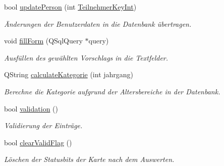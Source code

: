 \begin{CompactItemize}
bool \hyperlink{class_r_f_i_d_input_dialog_cfbdcec5da0cd09b10edbb23bfd9a185}{updatePerson} (int \hyperlink{class_r_f_i_d_input_dialog_557be7292bf8509e793dc17e79d18e75}{TeilnehmerKeyInt})
\begin{CompactList}\small\item\em Änderungen der Benutzerdaten in die Datenbank übertragen. \item\end{CompactList}\item 
void \hyperlink{class_r_f_i_d_input_dialog_7ed5355f398c29b79d81c4a4cd7b7c11}{fillForm} (QSqlQuery $\ast$query)
\begin{CompactList}\small\item\em Ausfüllen des gewählten Vorschlags in die Textfelder. \item\end{CompactList}\item 
QString \hyperlink{class_r_f_i_d_input_dialog_d034adfda34da3b178582a7aa17ae059}{calculateKategorie} (int jahrgang)
\begin{CompactList}\small\item\em Berechne die Kategorie aufgrund der Altersbereiche in der Datenbank. \item\end{CompactList}\item 
bool \hyperlink{class_r_f_i_d_input_dialog_ebed3331b476fb984343d6b3cef19a5a}{validation} ()
\begin{CompactList}\small\item\em Validierung der Einträge. \item\end{CompactList}\item 
bool \hyperlink{class_r_f_i_d_input_dialog_a466a7c7bb57d2c3163ce2d400b9f6af}{clearValidFlag} ()
\begin{CompactList}\small\item\em Löschen der Statusbits der Karte nach dem Auswerten. \item\end{CompactList}\end{CompactItemize}
